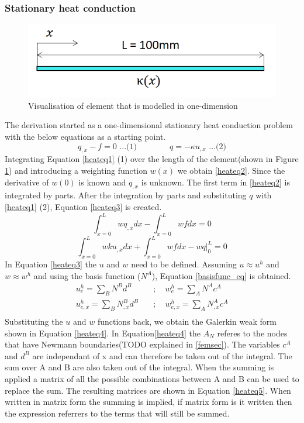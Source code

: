 	\subsubsection{Stationary heat conduction}
	\begin{figure}[H]
	\label{femfig}
	\centering
	\includegraphics[width = 0.75\linewidth]{figures/fem_sketch.png}
	\caption{Visualisation of element that is modelled in one-dimension}
	\end{figure}
	The derivation started as a one-dimensional stationary heat conduction problem with the below equations as a starting point.
	\begin{equation}
	\label{heateq1}
	q_{,x}-f = 0  \text{  ...(1)} \quad\quad\quad\quad q = -\kappa u_{,x} \text{  ...(2)} 
	\end{equation}
	Integrating Equation \ref{heateq1} (1) over the length of the element(shown in Figure \ref{femfig}) and introducing a weighting function $w(x)$ we obtain \ref{heateq2}. 
	Since the derivative of $w(0)$ is known and $q_{,x}$ is unknown. 
	The first term in \ref{heateq2} is integrated by parts. 
	After the integration by parts and substituting $q$ with \ref{heateq1} (2), Equation \ref{heateq3} is created.
	\begin{equation}
	\label{heateq2}
	\int_{x=0}^L wq_{,x}dx - \int_{x=0}^L wfdx = 0
	\end{equation}
	\begin{equation}
	\label{heateq3}
	\int_{x=0}^L wku_{,x}dx + \int_{x=0}^L wfdx - \left.wq\right|_0^L = 0
	\end{equation}
	In Equation \ref{heateq3} the $u$ and $w$ need to be defined.
	Assuming $u \approx u^h$ and $w \approx w^h$ and using the basis function ($N^A$), Equation \ref{basisfunc_eq} is obtained.
	\begin{equation}
	\label{basisfunc_eq}
	\begin{aligned}
	u_e^h = \sum_{B} N^B d^B  \quad &;\quad w_e^h = \sum_{A} N^A c^A\\
	u_{e,x}^h = \sum_{B} N_{,x}^B d^B \quad &;\quad w_{e,x}^h=\sum_A N_{,x}^A c^A\\
	\end{aligned}
	\end{equation}		
	Substituting the $u$ and $w$ functions back, we obtain the Galerkin weak form shown in Equation \ref{heateq4}.
	In Equation\ref{heateq4} the $A_N$ referes to the nodes that have Newmann boundaries(TODO explained in \ref{femsec}). 
	The variables $c^A$ and $d^B$ are independant of x and can therefore be taken out of the integral. 
	The sum over A and B are also taken out of the integral.
	When the summing is applied a matrix of all the possible combinations between A and B can be used to replace the sum. The resulting matrices are shown in Equation \ref{heateq5}. 
	When written in matrix form the summing is implied, if matrix form is it written then the expression referrers to the terms that will still be summed.

